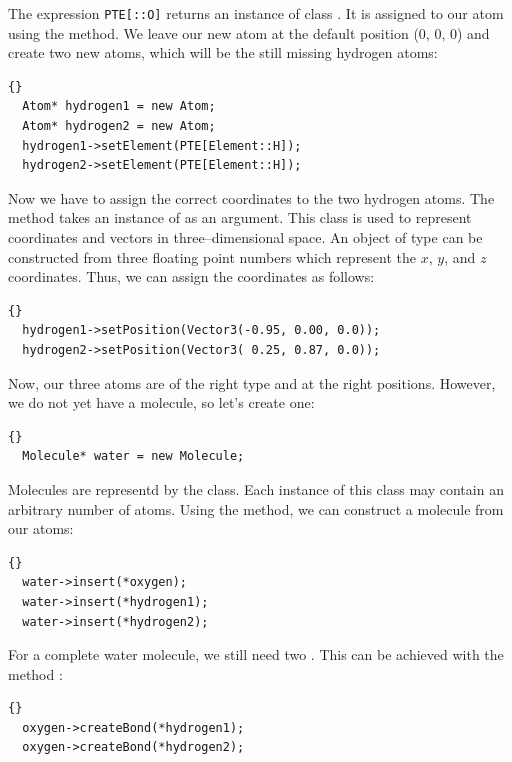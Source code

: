 \noindent
The expression {\tt PTE[::O]} returns an instance of class
. It is assigned to our atom using the 
method. We leave our new atom at the default position (0, 0, 0) and create two
new atoms, which will be the still missing hydrogen atoms:

\begin{lstlisting}{}
  Atom* hydrogen1 = new Atom;
  Atom* hydrogen2 = new Atom;
  hydrogen1->setElement(PTE[Element::H]);
  hydrogen2->setElement(PTE[Element::H]);
\end{lstlisting}
	
\noindent
Now we have to assign the correct coordinates to the two hydrogen atoms.  The
method  takes an instance of  as an
argument. This class is used to represent coordinates and vectors in
three--dimensional space. An object of type  can be constructed
from three floating point numbers which represent the $x$, $y$, and $z$
coordinates. Thus, we can assign the coordinates as follows:
 
\begin{lstlisting}{}
  hydrogen1->setPosition(Vector3(-0.95, 0.00, 0.0));
  hydrogen2->setPosition(Vector3( 0.25, 0.87, 0.0));
\end{lstlisting}

\noindent
Now, our three atoms are of the right type and at the right positions. However,
we do not yet have a molecule, so let's create one:

\begin{lstlisting}{}
  Molecule* water = new Molecule;
\end{lstlisting}

\noindent
Molecules are representd by the  class. Each instance of this
class may contain an arbitrary number of atoms. Using the 
method, we can construct a molecule from our atoms:

\begin{lstlisting}{}
  water->insert(*oxygen);
  water->insert(*hydrogen1);
  water->insert(*hydrogen2);
\end{lstlisting}

\noindent
For a complete water molecule, we still need two . This can be
achieved with the method :
	
\begin{lstlisting}{}
  oxygen->createBond(*hydrogen1);
  oxygen->createBond(*hydrogen2);
\end{lstlisting}

